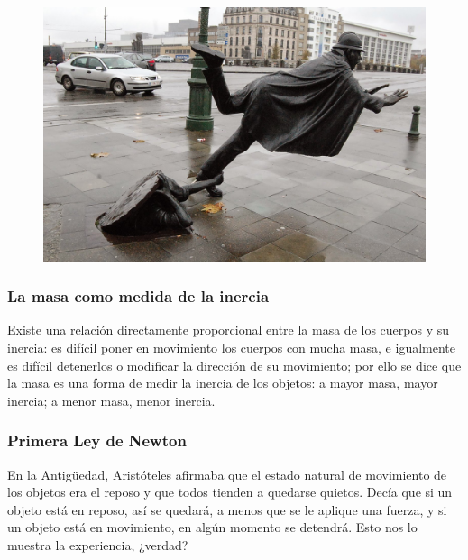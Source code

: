 \documentclass[11pt]{book}
\begin{document}
\begin{figure}[H]
    \centering
    \includegraphics[width=0.4\linewidth]{tropiezo.jpeg}
    \label{fig:tropiezo}
\end{figure}


\subsubsection{La masa como medida de la inercia}

Existe una relación directamente proporcional entre la masa de los cuerpos y su inercia:
es difícil poner en movimiento los cuerpos con mucha masa, e igualmente es
difícil detenerlos o modificar la dirección de su movimiento; por ello se dice que la masa
es una forma de medir la inercia de los objetos: a mayor masa, mayor inercia; a menor masa,
menor inercia.

\subsubsection{Primera Ley de Newton}

En la Antig\"uedad, Aristóteles afirmaba que el estado natural de movimiento de los
objetos era el reposo y que todos tienden a quedarse quietos. Decía que si un objeto
está en reposo, así se quedará, a menos que se le aplique una fuerza, y si un objeto
está en movimiento, en algún momento se detendrá. Esto nos lo muestra la experiencia, ¿verdad?\\
\end{document}
